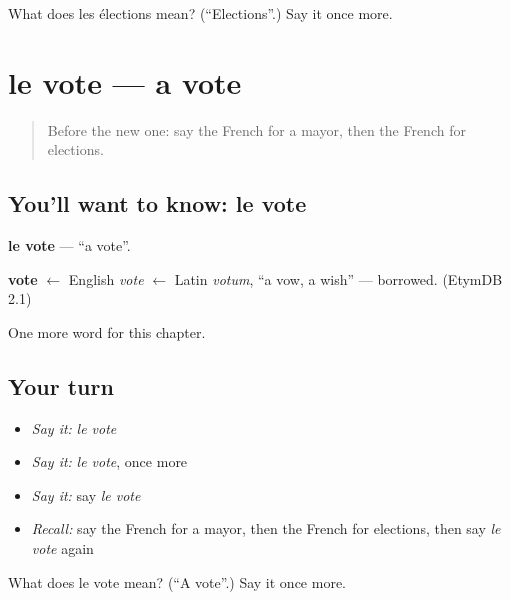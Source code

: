 \begin{tcolorbox}[breakable,colback=teal!4,colframe=teal!35!black,title={Before you move on}]
What does les élections mean? (\textquotedblleft{}Elections\textquotedblright{}.) Say it once more.
\end{tcolorbox}
\section[le vote]{le vote — a vote}

\label{lesson:FR-C248-vote}



\begin{quote}
Before the new one: say the French for a mayor, then the French for elections.
\end{quote}

\subsection*{You'll want to know: le vote}
\textbf{le vote} — \textquotedblleft{}a vote\textquotedblright{}.

\begin{cousinweb}
\textbf{vote} $\leftarrow$ English \emph{vote} $\leftarrow$ Latin \emph{votum}, \textquotedblleft{}a vow, a wish\textquotedblright{} — borrowed. (EtymDB 2.1)
\end{cousinweb}

\begin{grammarlens}[title={What you've built}]
One more word for this chapter.
\end{grammarlens}

\subsection*{Your turn}
\begin{itemize}
\raggedright
  \item \emph{Say it:} \emph{le vote}
  \item \emph{Say it:} \emph{le vote}, once more
  \item \emph{Say it:} say \emph{le vote}
  \item \emph{Recall:} say the French for a mayor, then the French for elections, then say \emph{le vote} again
\end{itemize}

\begin{tcolorbox}[breakable,colback=teal!4,colframe=teal!35!black,title={Before you move on}]
What does le vote mean? (\textquotedblleft{}A vote\textquotedblright{}.) Say it once more.
\end{tcolorbox}
